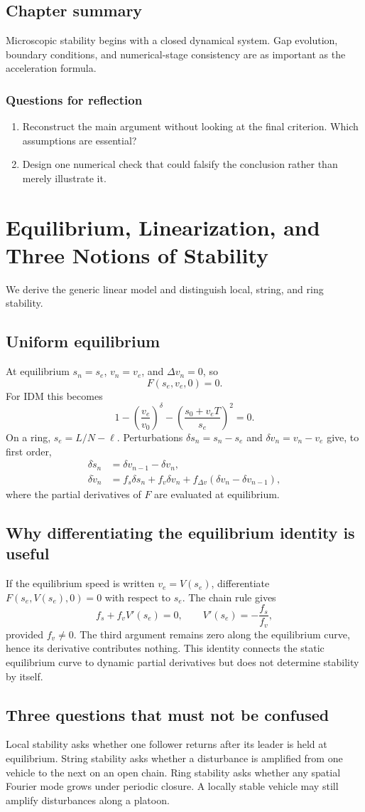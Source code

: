 \documentclass[11pt,a4paper,openany]{book}
\numberwithin{equation}{chapter}
\numberwithin{figure}{chapter}
\numberwithin{table}{chapter}
\newcommand{\chapterguide}[1]{\begin{tcolorbox}[keybox,title=Chapter guide]#1\end{tcolorbox}}
\newcommand{\chapterend}[1]{\section*{Chapter summary}\addcontentsline{toc}{section}{Chapter summary}\begin{tcolorbox}[resultbox]#1\end{tcolorbox}\subsection*{Questions for reflection}\begin{enumerate}[leftmargin=1.7em]\item Reconstruct the main argument without looking at the final criterion. Which assumptions are essential?\item Design one numerical check that could falsify the conclusion rather than merely illustrate it.\end{enumerate}\clearpage}
\begin{document}
\chapterend{Microscopic stability begins with a closed dynamical system. Gap evolution, boundary conditions, and numerical-stage consistency are as important as the acceleration formula.}

\chapter{Equilibrium, Linearization, and Three Notions of Stability}
\chapterguide{We derive the generic linear model and distinguish local, string, and ring stability.}

\section{Uniform equilibrium}
At equilibrium $s_n=s_e$, $v_n=v_e$, and $\Delta v_n=0$, so
\begin{equation}
F(s_e,v_e,0)=0.
\end{equation}
For IDM this becomes
\begin{equation}
1-\left(\frac{v_e}{v_0}\right)^\delta-\left(\frac{s_0+v_eT}{s_e}\right)^2=0.
\end{equation}
On a ring, $s_e=L/N-\ell$. Perturbations $\delta s_n=s_n-s_e$ and $\delta v_n=v_n-v_e$ give, to first order,
\begin{align}
\delta\dot s_n&=\delta v_{n-1}-\delta v_n,\\
\delta\dot v_n&=f_s\delta s_n+f_v\delta v_n+f_{\Delta v}(\delta v_n-\delta v_{n-1}),
\end{align}
where the partial derivatives of $F$ are evaluated at equilibrium.

\section{Why differentiating the equilibrium identity is useful}
If the equilibrium speed is written $v_e=V(s_e)$, differentiate $F(s_e,V(s_e),0)=0$ with respect to $s_e$. The chain rule gives
\begin{equation}
f_s+f_vV'(s_e)=0,
\qquad V'(s_e)=-\frac{f_s}{f_v},
\end{equation}
provided $f_v\ne0$. The third argument remains zero along the equilibrium curve, hence its derivative contributes nothing. This identity connects the static equilibrium curve to dynamic partial derivatives but does not determine stability by itself.

\section{Three questions that must not be confused}
Local stability asks whether one follower returns after its leader is held at equilibrium. String stability asks whether a disturbance is amplified from one vehicle to the next on an open chain. Ring stability asks whether any spatial Fourier mode grows under periodic closure. A locally stable vehicle may still amplify disturbances along a platoon.
\end{document}
